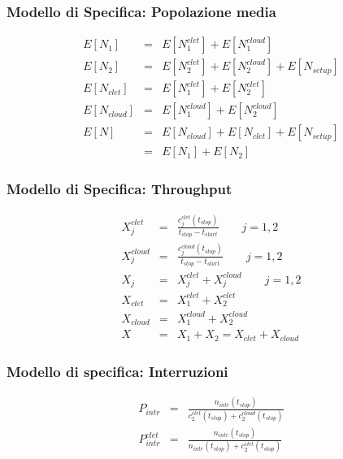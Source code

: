 \begin{frame}
\frametitle{Modello di Specifica: Popolazione media}
\setlength\arraycolsep{2pt}
\begin{eqnarray*}
\label{eq:n1}
E[N_{1}] & = & E[N_1^{clet}] + E[N_1^{cloud}]
\\[20pt]
\label{eq:n2}
E[N_{2}] & = & E[N_2^{clet}] + E[N_2^{cloud}] + E[N_{setup}]
\\[20pt]
\label{eq:nclet}
E[N_{clet}] & = & E[N_1^{clet}] + E[N_2^{clet}]
\\[20pt]
\label{eq:ncloud}
E[N_{cloud}] & = & E[N_1^{cloud}] + E[N_2^{cloud}]
\\[20pt]
\label{eq:n}
E[N] & = & E[N_{cloud}] + E[N_{clet}] + E[N_{setup}] 
\\   & = & E[N_{1}] + E[N_{2}]
\end{eqnarray*}
\end{frame}
\begin{frame}
\frametitle{Modello di Specifica: Throughput}
\setlength\arraycolsep{2pt}
\begin{eqnarray*}
\label{eq:xjclet}
X_j^{clet} & = & \frac{c_j^{clet}(t_{stop})}{t_{stop} - t_{start}} 
\qquad j = 1, 2 
\\[10pt]
\label{eq:xjcloud}
X_j^{cloud} & = & \frac{c_j^{cloud}(t_{stop})}{t_{stop} - t_{start}} 
\qquad j = 1, 2 
\\[10pt]
\label{eq:xj}
X_j & = & X_j^{clet} + X_j^{cloud}
\qquad j = 1, 2 
\\[10pt]
\label{eq:xclet}
X_{clet} & = & X_1^{clet} + X_2^{clet}
\\[10pt]
\label{eq:xcloud}
X_{cloud} & = & X_1^{cloud} + X_2^{cloud}
\\[10pt]
\label{eq:x}
X & = & X_1 + X_2 = X_{clet} + X_{cloud}
\end{eqnarray*}
\end{frame}
\begin{frame}
\frametitle{Modello di specifica: Interruzioni}
\setlength\arraycolsep{2pt}
\begin{eqnarray*}
P_{intr} &=& 
\frac{n_{intr}(t_{stop})}{c_2^{clet}(t_{stop}) + c_2^{cloud}(t_{stop})} \\[30pt]
P_{intr}^{clet} &=& 
\frac{n_{intr}(t_{stop})}{n_{intr}(t_{stop}) + c_2^{clet}(t_{stop})}
\end{eqnarray*}
%
\end{frame}
